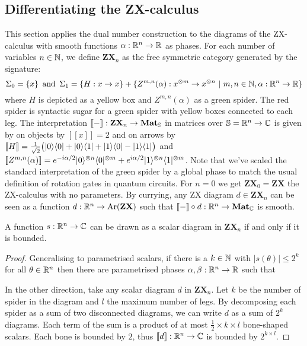 
\subsection{Differentiating the ZX-calculus}\label{2b-differentiating-zx}

This section applies the dual number construction to the diagrams of the ZX-calculus with smooth functions $\alpha : \R^n \to \R$ as phases.
For each number of variables $n \in \N$, we define $\mathbf{ZX}_n$ as the free symmetric category generated by the signature:
$$\Sigma_0 = \{ x \} \s \text{and} \s \Sigma_1 = \{ H : x \to x \} + \{ Z^{m, n}(\alpha) : x^{\otimes m} \to x^{\otimes n} \ \vert \ m, n \in \N, \alpha : \R^n \to \R \}$$
where $H$ is depicted as a yellow box and $Z^{m, n}(\alpha)$ as a green spider.
The red spider is syntactic sugar for a green spider with yellow boxes connected to each leg.
The interpretation $[\![-]\!]  : \mathbf{ZX}_n \to \mathbf{Mat}_\S$ in matrices over $\S = \R^n \to \C$ is given by on objects by $[\![ x ]\!] = 2$ and on arrows by
$[\![ H ]\!] = \frac{1}{\sqrt{2}} \big(\ket{0}\bra{0} + \ket{0}\bra{1} + \ket{1}\bra{0} - \ket{1}\bra{1}\big)$
and $[\![Z^{m, n}(\alpha)]\!] =
e^{-i \alpha / 2} \ket{0}^{\otimes n} \bra{0}^{\otimes m}
+ e^{i \alpha / 2} \ket{1}^{\otimes n} \bra{1}^{\otimes m}$.
Note that we've scaled the standard interpretation of the green spider by a global phase to match the usual definition of rotation gates in quantum circuits.
For $n = 0$ we get $\mathbf{ZX}_0 = \mathbf{ZX}$ the ZX-calculus with no parameters.
By currying, any ZX diagram $d \in \mathbf{ZX}_n$ can be seen as a function $d : \R^n \to \text{Ar}(\mathbf{ZX})$ such that $[\![-]\!] \circ d : \R^n \to \mathbf{Mat}_\C$ is smooth.

\begin{lemma}\label{lemma-scalars}
A function $s : \R^n \to \C$ can be drawn as a scalar diagram in $\mathbf{ZX}_n$ if and only if it is bounded.
\end{lemma}

\begin{proof}
Generalising \cite[P.~8.101]{CoeckeKissinger17} to parametrised scalars, if there is a $k \in \N$ with $\vert s(\theta) \vert \leq 2^k$ for all $\theta \in \R^n$ then there are parametrised phases $\alpha, \beta : \R^n \to \R$ such that


In the other direction, take any scalar diagram $d$ in $\mathbf{ZX}_n$.
Let $k$ be the number of spider in the diagram and $l$ the maximum number
of legs. By decomposing each spider as a sum of two disconnected diagrams,
we can write $d$ as a sum of $2^k$ diagrams. Each term of the sum is a product
of at most $\frac{1}{2} \times k \times l$ bone-shaped scalars. Each bone is
bounded by $2$, thus $[\![d]\!] : \R^n \to \C$ is bounded by $2^{k \times l}$.
\end{proof}

